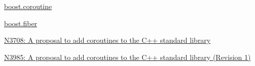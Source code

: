 \begin{thebibliography}{99}

        \href{http://www.boost.org/doc/libs/1_55_0/libs/coroutine/doc/html/index.html}
        {boost.coroutine}

        \href{http://olk.github.io/libs/fiber/doc/html/}
        {boost.fiber}

        \href{http://www.open-std.org/jtc1/sc22/wg21/docs/papers/2013/n3708.pdf}
        {N3708: A proposal to add coroutines to the C++ standard library}

        \href{http://www.open-std.org/jtc1/sc22/wg21/docs/papers/2014/n3985.pdf}
        {N3985: A proposal to add coroutines to the C++ standard library (Revision 1)}

\end{thebibliography}


